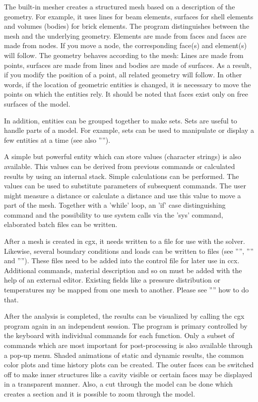 \documentclass{article}
\begin{document}
The built-in mesher creates a structured mesh based on a description of the geometry. For example, it uses lines for beam elements, surfaces for shell elements and volumes (bodies) for brick elements. The program distinguishes between the mesh and the underlying geometry. Elements are made from faces and faces are made from nodes. If you move a node, the corresponding face(s) and element(s) will follow. The geometry behaves according to the mesh:
Lines are made from points, surfaces are made from lines and bodies are made of surfaces. As a result, if you modify the position of a point, all related geometry will follow. In other words, if the location of geometric entities is changed, it is necessary to move the points on which the entities rely.  It should be noted that faces exist only on free surfaces of the model.

In addition, entities can be grouped together to make sets. Sets are useful to handle parts of a model. For example, sets can be used to manipulate or display a few entities at a time (see also ''''). 

A simple but powerful entity which can store values (character strings) is also available. This values can be derived from previous commands or calculated results by using an internal stack. Simple calculations can be performed. The values can be used to substitute parameters of subsequent commands. The user might measure a distance or calculate a distance and use this value to move a part of the mesh. Together with a 'while' loop, an 'if' case distinguishing command and the possibility to use system calls via the 'sys' command, elaborated batch files can be written.  

After a mesh is created in cgx, it needs written to a file for use with the solver. Likewise, several boundary conditions and loads can be written to files (see '''', '''' and ''''). These files need to be added into the control file for later use in ccx. Additional commands, material description and so on must be added with the help of an external editor. Existing fields like a pressure distribution or temperatures my be mapped from one mesh to another. Please see '''' how to do that.

After the analysis is completed, the results can be visualized by calling the cgx program again in an independent session. The program is primary controlled by the keyboard with individual commands for each function. Only a subset of commands which are most important for post-processing is also available through a pop-up menu. Shaded animations of static and dynamic results, the common color plots and time history plots can be created. The outer faces can be switched off to make inner structures like a cavity visible or certain faces may be displayed in a transparent manner. Also, a cut through the model can be done which creates a section and it is possible to zoom through the model.
\end{document}
